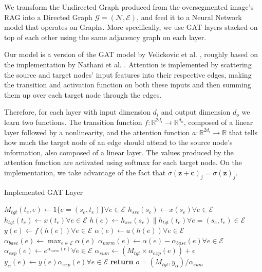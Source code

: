 \documentclass[twocolumn]{article}
\newcommand{\concat}[2]{\ensuremath{#1\|#2}}
\newcommand{\reals}{\mathbb{R}}
\begin{document}
We transform the Undirected Graph produced from the oversegmented image's RAG into a Directed Graph $\mathcal{G}=(\mathcal{N},\mathcal{E})$, and feed it to a Neural Network model that operates on Graphs. More specifically, we use GAT layers stacked on top of each other using the same adjacency graph on each layer.

Our model is a version of the GAT model by Velickovic et al. \cite{velickovic2018gat}, roughly based on the implementation by Nathani et al. \cite{nathani2019kbgat}. Attention is implemented by scattering the source and target nodes' input features into their respective edges, making the transition and activation function on both these inputs and then summing them up over each target node through the edges.

Therefore, for each layer with input dimension $d_i$ and output dimension $d_o$ we learn two functions. The transition function $f : \reals^{2d_i} \rightarrow \reals^{d_o}$, composed of a linear layer followed by a nonlinearity, and the attention function $a : \reals^{2d_i} \rightarrow \reals$ that tells how much the target node of an edge should attend to the source node's information, also composed of a linear layer. 
The values produced by the attention function are activated using softmax for each target node. On the implementation, we take advantage of the fact that $\sigma(\mathbf{z} + \mathbf{c})_{j} = \sigma(\mathbf{z})_{j}$.

\begin{algorithm}[tpb]
\caption{Implemented GAT Layer}\label{algo:gatlayer}
\begin{algorithmic}[1]
\State $M_{tgt}(t_e,e) \gets \mathrm{1}\{e = (s_e,t_e)\} \forall e \in \mathcal{E}$
\State $h_{src}(s_e) \gets x(s_e) \forall e \in \mathcal{E}$
\State $h_{tgt}(t_e) \gets x(t_e) \forall e \in \mathcal{E}$
\State $h(e) \gets \concat{h_{src}(s_e)}{h_{tgt}(t_e)} \forall e = (s_e,t_e) \in \mathcal{E}$
\State $y(e) \gets f(h(e)) \forall e \in \mathcal{E}$
\State $\alpha(e) \gets a(h(e)) \forall e \in \mathcal{E}$
\State $\alpha_{base}(e) \gets \max_{e \in \mathcal{E}} \alpha(e) $
\State $\alpha_{norm}(e) \gets \alpha(e) - \alpha_{base}(e) \forall e \in \mathcal{E}$
\State $\alpha_{exp}(e) \gets e^{\alpha_{norm}(e)} \forall e \in \mathcal{E}$
\State $\alpha_{sum} \gets (M_{tgt} \times \alpha_{exp}(e)) + \epsilon$
\State $y_{\alpha}(e) \gets y(e)\alpha_{exp}(e) \forall e \in \mathcal{E}$
\State \textbf{return} $o = (M_{tgt}, y_{\alpha}) / \alpha_{sum}$
\EndProcedure
\end{algorithmic}
\end{algorithm}
\end{document}
